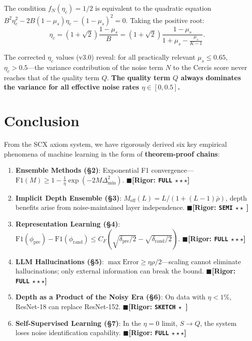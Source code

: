 \documentclass[12pt,a4paper]{article}
\theoremstyle{definition}
\theoremstyle{remark}
\newcommand{\rigorFull}{$\blacksquare$\;\textbf{[Rigor: \texttt{FULL} $\star\star\star$]}}
\newcommand{\rigorSemi}{$\blacksquare$\;\textbf{[Rigor: \texttt{SEMI} $\star\star\;$]}}
\newcommand{\rigorSketch}{$\blacksquare$\;\textbf{[Rigor: \texttt{SKETCH} $\star\;\;$]}}
\begin{document}
The condition $f_N(\eta_c) = 1/2$ is equivalent to the quadratic equation $B^2\eta_c^2 - 2B(1-\mu_s)\eta_c - (1-\mu_s)^2 = 0$. Taking the positive root:
\begin{equation}
\boxed{\eta_c = (1+\sqrt{2})\frac{1-\mu_s}{B} = (1+\sqrt{2})\frac{1-\mu_s}{1 + \mu_s - \frac{\mu_s}{K-1}}}.
\end{equation}

The corrected $\eta_c$ values (v3.0) reveal: for all practically relevant $\mu_s \leq 0.65$, $\eta_c > 0.5$---the variance contribution of the noise term $N$ to the Cercis score never reaches that of the quality term $Q$. \textbf{The quality term $Q$ always dominates the variance for all effective noise rates $\eta \in [0, 0.5]$.}

\section*{Conclusion}

From the SCX axiom system, we have rigorously derived six key empirical phenomena of machine learning in the form of \textbf{theorem-proof chains}:
\begin{enumerate}
\item \textbf{Ensemble Methods (\S2)}: Exponential F1 convergence---$\mathrm{F1}(M) \geq 1 - \frac{1}{\eta}\exp(-2M\Delta_{\min}^2)$. \rigorFull
\item \textbf{Implicit Depth Ensemble (\S3)}: $M_{\text{eff}}(L) = L/(1+(L-1)\bar{\rho})$, depth benefits arise from noise-maintained layer independence. \rigorSemi
\item \textbf{Representation Learning (\S4)}: $\mathrm{F1}(\phi_{\text{pre}}) - \mathrm{F1}(\phi_{\text{rand}}) \leq C_F(\sqrt{\delta_{\text{pre}}/2} - \sqrt{\delta_{\text{rand}}/2})$. \rigorFull
\item \textbf{LLM Hallucinations (\S5)}: $\max\text{Error} \geq \eta\rho/2$---scaling cannot eliminate hallucinations; only external information can break the bound. \rigorFull
\item \textbf{Depth as a Product of the Noisy Era (\S6)}: On data with $\eta < 1\%$, ResNet-18 can replace ResNet-152. \rigorSketch
\item \textbf{Self-Supervised Learning (\S7)}: In the $\eta=0$ limit, $S \to Q$, the system loses noise identification capability. \rigorFull
\end{enumerate}
\end{document}
